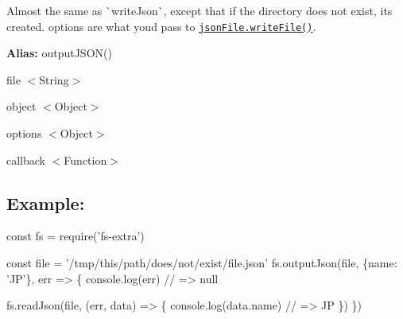 Almost the same as \`{}write\+Json\`{}, except that if the directory does not exist, it\textquotesingle{}s created. {\ttfamily options} are what you\textquotesingle{}d pass to \href{https://github.com/jprichardson/node-jsonfile#writefilefilename-options-callback}{\tt {\ttfamily json\+File.\+write\+File()}}.

{\bfseries Alias\+:} {\ttfamily output\+J\+S\+O\+N()}


\begin{DoxyItemize}
\item {\ttfamily file} {\ttfamily $<$String$>$}
\item {\ttfamily object} {\ttfamily $<$Object$>$}
\item {\ttfamily options} {\ttfamily $<$Object$>$}
\item {\ttfamily callback} {\ttfamily $<$Function$>$}
\end{DoxyItemize}

\subsection*{Example\+:}


\begin{DoxyCode}
const fs = require('fs-extra')

const file = '/tmp/this/path/does/not/exist/file.json'
fs.outputJson(file, \{name: 'JP'\}, err => \{
  console.log(err) // => null

  fs.readJson(file, (err, data) => \{
    console.log(data.name) // => JP
  \})
\})
\end{DoxyCode}
 